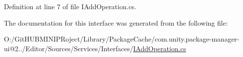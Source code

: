 Definition at line 7 of file I\+Add\+Operation.\+cs.



The documentation for this interface was generated from the following file\+:\begin{DoxyCompactItemize}
\item 
O\+:/\+Git\+H\+U\+B\+M\+I\+N\+I\+P\+Roject/\+Library/\+Package\+Cache/com.\+unity.\+package-\/manager-\/ui@2../\+Editor/\+Sources/\+Services/\+Interfaces/\mbox{\hyperlink{_i_add_operation_8cs}{I\+Add\+Operation.\+cs}}\end{DoxyCompactItemize}
